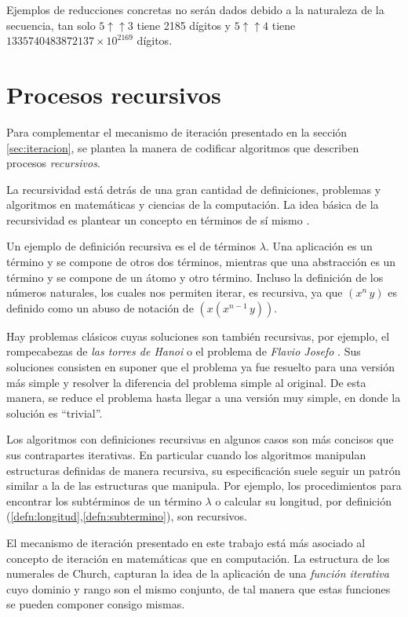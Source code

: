 Ejemplos de reducciones concretas no serán dados debido a la naturaleza de la secuencia, tan solo \( 5 \mathbin{\uparrow\uparrow} 3 \) tiene 2185 dígitos y \( 5 \mathbin{\uparrow\uparrow} 4 \) tiene \( 1335740483872137\times 10^{2169} \) dígitos.

\section{Procesos recursivos}
\label{sec:procesos-recursivos}

Para complementar el mecanismo de iteración presentado en la sección \ref{sec:iteracion}, se plantea la manera de codificar algoritmos que describen procesos \emph{recursivos}.

La recursividad está detrás de una gran cantidad de definiciones, problemas y algoritmos en matemáticas y ciencias de la computación. La idea básica de la recursividad es plantear un concepto en términos de sí mismo \cite{knuth:Concrete}.

Un ejemplo de definición recursiva es el de términos \( λ \). Una aplicación es un término y se compone de otros dos términos, mientras que una abstracción es un término y se compone de un átomo y otro término. Incluso la definición de los números naturales, los cuales nos permiten iterar, es recursiva, ya que \( (x^{n}\, y) \) es definido como un abuso de notación de \( (x(x^{n-1}\, y)) \).

Hay problemas clásicos cuyas soluciones son también recursivas, por ejemplo, el rompecabezas de \emph{las torres de Hanoi} o el problema de \emph{Flavio Josefo} \cite{knuth:Concrete}. Sus soluciones consisten en suponer que el problema ya fue resuelto para una versión más simple y resolver la diferencia del problema simple al original. De esta manera, se reduce el problema hasta llegar a una versión muy simple, en donde la solución es ``trivial''.

Los algoritmos con definiciones recursivas en algunos casos son más concisos que sus contrapartes iterativas. En particular cuando los algoritmos manipulan estructuras definidas de manera recursiva, su especificación suele seguir un patrón similar a la de las estructuras que manipula. Por ejemplo, los procedimientos para encontrar los subtérminos de un término \( λ \) o calcular su longitud, por definición (\ref{defn:longitud},\ref{defn:subtermino}), son recursivos.

El mecanismo de iteración presentado en este trabajo está más asociado al concepto de iteración en matemáticas que en computación. La estructura de los numerales de Church, capturan la idea de la aplicación de una \emph{función iterativa} cuyo dominio y rango son el mismo conjunto, de tal manera que estas funciones se pueden componer consigo mismas.

